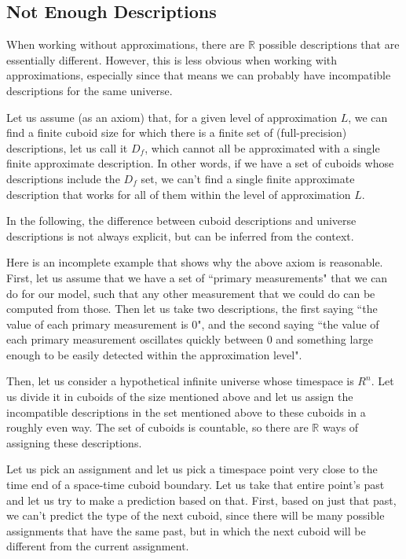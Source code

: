 \documentclass[a4paper
]{article}
\def\reale{\mathbb{R}}
\newcommand{\ghilimele}[1]{``#1"}
\begin{document}
\subsection{Not Enough Descriptions}
\label{sec:not-enough-descriptions}

When working without approximations, there are $\reale$ possible descriptions
that are essentially different. However, this is less obvious when working with
approximations, especially since that means we can probably have incompatible
descriptions for the same universe.

Let us assume (as an axiom) that, for a given level of approximation $L$, we can
find a finite cuboid size for which there is a finite set of
(full-precision)
descriptions, let us call it $D_f$, which cannot all be approximated with a
single finite approximate description.
In other words, if we have a set of cuboids whose descriptions include
the $D_f$ set, we can't
find a single finite approximate description that works for all of them
within the level of approximation $L$.

In the following, the difference between
cuboid descriptions and universe descriptions is not always explicit,
but can be inferred from the context.

Here is an incomplete example that shows why the above axiom is reasonable.
First, let us assume that we have a set of
\ghilimele{primary measurements} that we
can do for our model, such that any other measurement that we could do can be
computed from those.
Then let us take two descriptions, the first saying
\ghilimele{the value of each primary measurement is $0$},
and the second saying
\ghilimele{the value of each primary measurement oscillates quickly
  between $0$ and something large enough to be easily detected within
  the approximation level}.

Then, let us consider a hypothetical infinite universe whose timespace is $R^n$.
Let us divide it in cuboids of the size mentioned above
and let us assign the incompatible
descriptions in the set mentioned above to these cuboids in a roughly even
way.
The set of cuboids is countable, so there are $\reale$ ways of
assigning these descriptions.

Let us pick an assignment and let us pick a timespace point very close to the
time end of a space-time cuboid boundary.
Let us take that entire point's past and let us try to make a prediction based
on that.
First, based on just that past, we can't predict the type of the next cuboid,
since there will be many possible assignments that have the same past, but in
which the next cuboid will be different from the current assignment.
\end{document}
